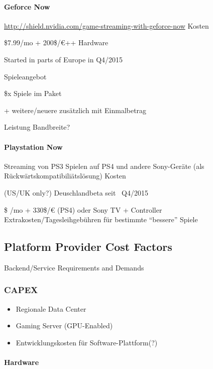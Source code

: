



\paragraph{Geforce Now}
\url{http://shield.nvidia.com/game-streaming-with-geforce-now}
Kosten

\$7.99/mo + 200\$/€++ Hardware

Started in parts of Europe in Q4/2015

Spieleangebot

\$x Spiele im Paket

 + weitere/neuere zusätzlich mit Einmalbetrag

Leistung
Bandbreite? 

\paragraph{Playstation Now}
Streaming von PS3 Spielen auf PS4 und andere Sony-Geräte (als Rückwärtskompatibiliätslösung)
Kosten

(US/UK only?) Deuschlandbeta seit ~Q4/2015

\$ /mo + 330\$/€ (PS4) oder Sony TV + Controller
Extrakosten/Tagesleihgebühren für bestimmte ``bessere'' Spiele




\subsection{Platform Provider Cost Factors}
Backend/Service Requirements and Demands

\subsubsection{CAPEX}

\begin{itemize}
	\item Regionale Data Center
	\item Gaming Server (GPU-Enabled)
	\item Entwicklungskosten für Software-Plattform(?)
\end{itemize}

\paragraph{Hardware}

